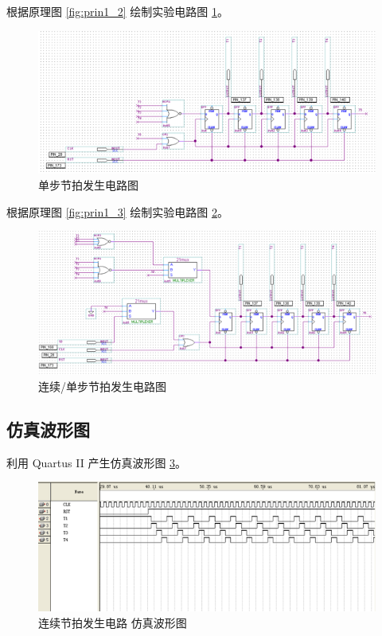 根据原理图 \ref{fig:prin1_2} 绘制实验电路图 \ref{fig:bdf1_2}。

\begin{figure}[H]
\centering
\includegraphics[width=\textwidth]{images/bdf1_2.png}
\caption{单步节拍发生电路图}
\label{fig:bdf1_2}
\end{figure}

根据原理图 \ref{fig:prin1_3} 绘制实验电路图 \ref{fig:bdf1_3}。

\begin{figure}[H]
\centering
\includegraphics[width=\textwidth]{images/bdf1_3.png}
\caption{连续/单步节拍发生电路图}
\label{fig:bdf1_3}
\end{figure}

\subsection{仿真波形图}

利用 Quartus II 产生仿真波形图 \ref{fig:wave1_1}。

\begin{figure}[H]
\centering
\includegraphics[width=\textwidth]{images/wave1_1.png}
\caption{连续节拍发生电路 仿真波形图}
\label{fig:wave1_1}
\end{figure}

